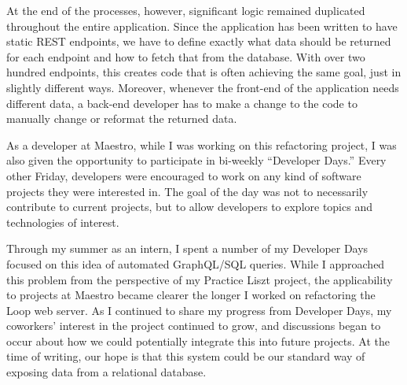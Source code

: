 At the end of the processes, however, significant logic remained duplicated throughout the entire application.  Since the application has been written to have static REST endpoints, we have to define exactly what data should be returned for each endpoint and how to fetch that from the database. With over two hundred endpoints, this creates code that is often achieving the same goal, just in slightly different ways.  Moreover, whenever the front-end of the application needs different data, a back-end developer has to make a change to the code to manually change or reformat the returned data.

As a developer at Maestro, while I was working on this refactoring project, I was also given the opportunity to participate in bi-weekly ``Developer Days.''  Every other Friday, developers were encouraged to work on any kind of software projects they were interested in.  The goal of the day was not to necessarily contribute to current projects, but to allow developers to explore topics and technologies of interest.

Through my summer as an intern, I spent a number of my Developer Days focused on this idea of automated GraphQL/SQL queries. While I approached this problem from the perspective of my Practice Liszt project, the applicability to projects at Maestro became clearer the longer I worked on refactoring the Loop web server.  As I continued to share my progress from Developer Days, my coworkers' interest in the project continued to grow, and discussions began to occur about how we could potentially integrate this into future projects.  At the time of writing, our hope is that this system could be our standard way of exposing data from a relational database.